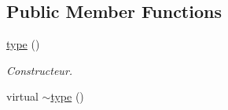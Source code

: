 \subsection*{Public Member Functions}
\begin{DoxyCompactItemize}
\item 
\hypertarget{classtype_a24236b97ec65acd7624c81fc33305e7c}{\hyperlink{classtype_a24236b97ec65acd7624c81fc33305e7c}{type} ()}\label{classtype_a24236b97ec65acd7624c81fc33305e7c}

\begin{DoxyCompactList}\small\item\em Constructeur. \end{DoxyCompactList}\item 
\hypertarget{classtype_a87f20c8ea87a2752a61aacd9a818ae8e}{virtual \hyperlink{classtype_a87f20c8ea87a2752a61aacd9a818ae8e}{$\sim$type} ()}\label{classtype_a87f20c8ea87a2752a61aacd9a818ae8e}


\end{DoxyCompactItemize}

